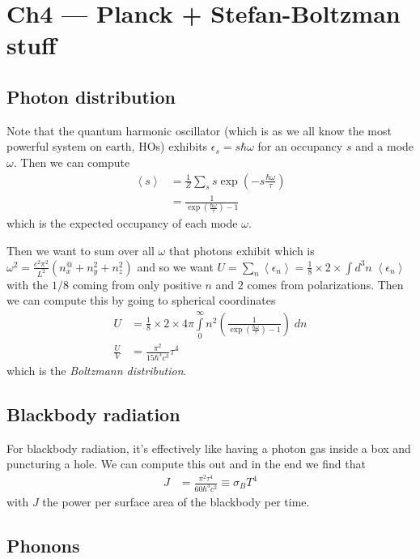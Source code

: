 \documentclass[10pt,twocolumn]{article}
\newcommand{\expvalue}[1]{\left<#1\right>}
\begin{document}
\section{Ch4 --- Planck + Stefan-Boltzman stuff}

\subsection{Photon distribution}

Note that the quantum harmonic oscillator (which is as we all know the most powerful system on earth, HOs) exhibits $\epsilon_s = s\hbar \omega$ for an occupancy $s$ and a mode $\omega$. Then we can compute
\begin{align}
    \expvalue{s} &= \frac{1}{Z}\sum\limits_{s}^{}s\exp\left( -s\frac{\hbar \omega}{\tau} \right)\\
    &= \frac{1}{\exp\left( \frac{\hbar \omega}{\tau} \right) - 1}
\end{align}
which is the expected occupancy of each mode $\omega$.

Then we want to sum over all $\omega$ that photons exhibit which is $\omega^2 = \frac{c^2 \pi^2}{L^2}\left( n_x^@ + n_y^2 + n_z^2 \right)$ and so we want $U = \sum\limits_{n}^{}\expvalue{\epsilon_n} = \frac{1}{8} \times 2 \times\int d^3n\; \expvalue{\epsilon_n}$ with the $1/8$ coming from only positive $n$ and $2$ comes from polarizations. Then we can compute this by going to spherical coordinates
\begin{align}
    U &= \frac{1}{8} \times 2 \times 4\pi\int\limits_{0}^{\infty}n^2\left( \frac{1}{\exp\left( \frac{\hbar \omega}{\tau} \right) - 1} \right)\;dn\\
    \frac{U}{V} &= \frac{\pi^2}{15 \hbar^3 c^3}\tau^4
\end{align}
which is the \emph{Boltzmann distribution}.

\subsection{Blackbody radiation}

For blackbody radiation, it's effectively like having a photon gas inside a box and puncturing a hole. We can compute this out and in the end we find that
\begin{align}
    J &= \frac{\pi^2 \tau^4}{60 \hbar^3 c^2} \equiv \sigma_B T^4
\end{align}
with $J$ the power per surface area of the blackbody per time.

\subsection{Phonons}
\end{document}
